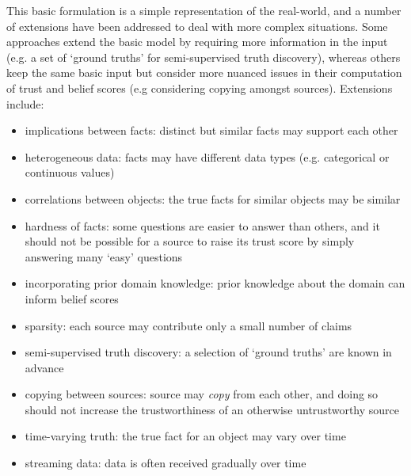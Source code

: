 \documentclass[../main.tex]{subfiles}
\begin{document}
This basic formulation is a simple representation of the real-world, and a
number of extensions have been addressed to deal with more complex situations.
Some approaches extend the basic model by requiring more information in the
input (e.g. a set of `ground truths' for semi-supervised truth discovery),
whereas others keep the same basic input but consider more nuanced issues in
their computation of trust and belief scores (e.g considering copying amongst
sources). Extensions include:
\begin{itemize}
\item implications between facts: distinct but similar facts may support each
other \cite{yin_han_yu}

\item heterogeneous data: facts may have different data types (e.g.
categorical or continuous values) \cite{li_conflicts}

\item correlations between objects: the true facts for similar objects may be
similar \cite{yang}

\item hardness of facts: some questions are easier to answer than others, and
it should not be possible for a source to raise its trust score by simply
answering many `easy' questions \cite{galland}

\item incorporating prior domain knowledge: prior knowledge about the domain
can inform belief scores \cite{pasternack}

\item sparsity: each source may contribute only a small number of claims
\cite{zhang_sparse}

\item semi-supervised truth discovery: a selection of `ground truths' are known
in advance \cite{yin_supervised}

\item copying between sources: source may \emph{copy} from each other, and
doing so should not increase the trustworthiness of an otherwise untrustworthy
source \cite{dong}

\item time-varying truth: the true fact for an object may vary over time
\cite{dong}

\item streaming data: data is often received gradually over time \cite{zhao}

\end{itemize}
\end{document}
